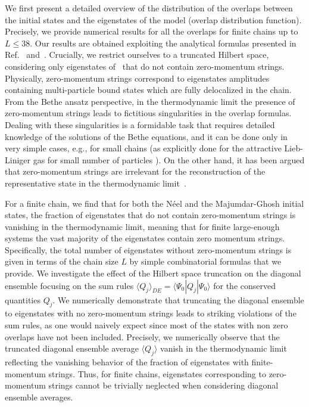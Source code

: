 \documentclass[11pt]{iopart}
\begin{document}
We first present a detailed overview of the distribution of the overlaps between 
the initial states and the eigenstates of the model (overlap distribution function). 
Precisely, we provide numerical results for all the overlaps for finite chains up 
to $L\le 38$. Our results are obtained exploiting the analytical formulas 
presented in Ref.~\cite{brockmann-2014} and~\cite{pozsgay-2014a}. Crucially, 
we restrict ourselves to a truncated Hilbert space, considering only eigenstates 
of~ that do not contain zero-momentum strings. Physically, 
zero-momentum strings correspond to eigenstates amplitudes containing multi-particle  
bound states which are fully delocalized in the chain. From the Bethe ansatz perspective, 
in the thermodynamic limit the presence of zero-momentum strings leads to fictitious 
singularities in the overlap formulas. Dealing with these singularities is 
a formidable task that requires detailed knowledge of the solutions of the 
Bethe equations, and it can be done only in very simple cases, e.g., for small 
chains (as explicitly done for the attractive Lieb-Liniger gas for small number of particles \cite{calabrese-2014}). 
On the other hand, it has been argued that zero-momentum strings are irrelevant for the reconstruction of the 
representative state in the thermodynamic limit~\cite{wouters-2014A}. 

For a finite chain, we find that for both the N\'eel and the Majumdar-Ghosh initial states, 
the fraction of eigenstates that do not contain zero-momentum strings 
is vanishing in the thermodynamic limit, meaning that for finite large-enough 
systems the vast majority of the eigenstates contain zero momentum strings. Specifically, 
the total number of eigenstates without zero-momentum strings is given in terms of the 
chain size $L$ by simple combinatorial formulas that we provide. 
%
We investigate the effect of the Hilbert space truncation on the diagonal ensemble focusing on the  
sum rules $\langle Q_j\rangle_{DE}=\langle\Psi_0|Q_j|\Psi_0\rangle$ for the conserved quantities $Q_j$. 
We numerically demonstrate that truncating the diagonal ensemble to 
eigenstates with no zero-momentum strings leads to striking violations of the sum rules,  
as one would naively expect since most of the states with non zero overlaps have not been included. 
Precisely, we numerically observe that the truncated diagonal ensemble 
average $\langle Q_j\rangle$ vanish in the thermodynamic limit reflecting the 
vanishing behavior of the fraction of eigenstates with finite-momentum strings. 
Thus, for finite chains, eigenstates corresponding 
to zero-momentum strings cannot be trivially neglected when considering 
diagonal ensemble averages. 
\end{document}
